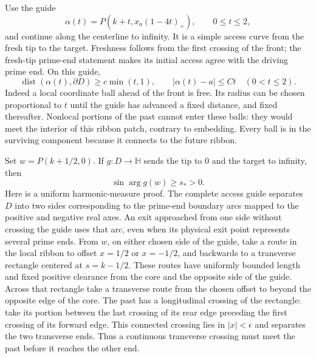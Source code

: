 \documentclass[11pt]{article}
\theoremstyle{definition}
\theoremstyle{remark}
\numberwithin{equation}{section}
\begin{document}
Use the guide
\[
 \alpha(t)=P(k+t,x_a(1-4t)_+),\qquad 0\le t\le2,
\]
and continue along the centerline to infinity.  It is a simple access
curve from the fresh tip to the target.  Freshness follows from the first
crossing of the front; the fresh-tip prime-end statement makes its
initial access agree with the driving prime end.  On this guide,
\begin{equation}\label{rc:guide-clearance}
 \operatorname{dist}(\alpha(t),\partial D)\ge c\min(t,1),
 \qquad |\alpha(t)-a|\le Ct\quad(0<t\le2).
\end{equation}
Indeed a local coordinate ball ahead of the front is free.  Its radius
can be chosen proportional to $t$ until the guide has advanced a fixed
distance, and fixed thereafter.  Nonlocal portions of the past cannot
enter these balls: they would meet the interior of this ribbon patch,
contrary to embedding.  Every ball is in the surviving component because
it connects to the future ribbon.

Set $w=P(k+1/2,0)$.  If $g:D\to\mathbb H$ sends the tip to $0$ and the
target to infinity, then
\begin{equation}\label{rc:waypoint-angle}
 \sin\arg g(w)\ge s_*>0.
\end{equation}
Here is a uniform harmonic-measure proof. The complete access guide
separates $D$ into two sides corresponding to the prime-end boundary
arcs mapped to the positive and negative real axes. An exit approached
from one side without crossing the guide uses that arc, even when its
physical exit point represents several prime ends. From $w$, on either
chosen side of the guide, take a route in the local ribbon to offset
$x=1/2$ or $x=-1/2$,
and backwards to a transverse rectangle centered at $s=k-1/2$.
These routes have uniformly bounded length and fixed positive clearance
from the core and the opposite side of the guide.  Across that rectangle
take a transverse route from the chosen offset to beyond the opposite
edge of the core.  The past has a longitudinal crossing of the rectangle:
take its portion between the last crossing of its rear edge preceding
the first crossing of its forward edge.  This connected crossing lies
in $|x|<\epsilon$ and separates the two transverse ends.  Thus a
continuous transverse crossing must meet the past before it reaches the
other end.
\end{document}
